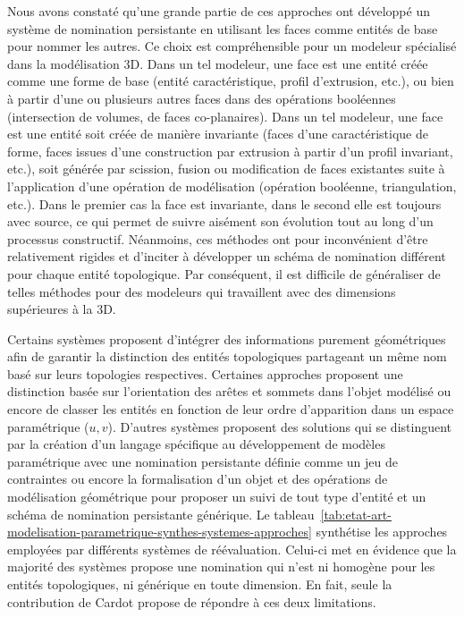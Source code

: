 Nous avons constaté qu'une grande partie de ces approches ont développé un système
de nomination persistante en utilisant les faces comme entités de base pour
nommer les autres. %
Ce choix est compréhensible pour un modeleur spécialisé dans
la modélisation 3D. %
Dans un tel modeleur, une face est une entité créée comme une forme de base
(entité caractéristique, profil d'extrusion, etc.), ou bien
à partir d'une ou plusieurs autres faces dans des opérations
booléennes (intersection de volumes, de faces co-planaires).
Dans un tel modeleur, une face est une entité soit créée de manière invariante (faces d'une caractéristique de forme, faces issues d'une construction par extrusion à partir d'un profil invariant, etc.), soit générée par scission, fusion ou modification de faces existantes suite à l'application d'une opération de modélisation (opération booléenne, triangulation, etc.). Dans le premier cas la face est invariante, dans le second elle est toujours avec source, ce qui permet de
suivre aisément son évolution tout au long d'un processus constructif. Néanmoins, ces méthodes ont pour inconvénient d'être relativement rigides et d'inciter à développer un schéma de nomination différent pour chaque entité topologique. %
Par conséquent, il est difficile de généraliser de telles méthodes pour
des modeleurs qui travaillent avec des dimensions supérieures à la 3D. %

Certains systèmes proposent d'intégrer des informations purement géométriques
afin de garantir la distinction des entités topologiques partageant un même nom
basé sur leurs topologies respectives. %
Certaines approches proposent une distinction basée sur l'orientation des arêtes
et sommets dans l'objet modélisé ou encore de classer les entités en fonction de
leur ordre d'apparition dans un espace paramétrique (\(u,v\)). %
D'autres systèmes proposent des solutions qui se distinguent par la création d'un langage spécifique au développement de modèles
paramétrique avec une nomination persistante définie comme un jeu de contraintes
ou encore la formalisation d'un objet et des opérations de modélisation
géométrique pour proposer un suivi de tout type d'entité et un schéma de
nomination persistante générique. %
Le tableau~\ref{tab:etat-art-modelisation-parametrique-synthes-systemes-approches} synthétise les approches employées par différents systèmes de réévaluation. %
Celui-ci met en évidence que la majorité des systèmes propose une nomination qui n'est ni homogène pour les entités topologiques, ni générique en toute dimension. %
En fait, seule la contribution de Cardot propose de répondre à ces deux limitations. %

